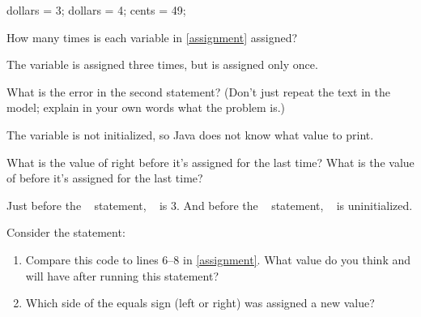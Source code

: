 \vspace{1em}
\hfill
\begin{minipage}[t]{0.5\textwidth}

\vspace{-1em}
\begin{javalst}
dollars = 3;
dollars = 4;
cents = 49;
\end{javalst}

\end{minipage}
\hfill
\begin{minipage}[t]{0.4\textwidth}

\par\vspace{1em}

\end{minipage}
\vspace{1ex}




\Q How many times is each variable in \ref{assignment} assigned?

\begin{answer}
The variable  is assigned three times, but  is assigned only once.
\end{answer}


\Q What is the error in the second  statement? (Don't just repeat the text in the model; explain in your own words what the problem is.)

\begin{answer}
The variable  is not initialized, so Java does not know what value to print.
\end{answer}


\Q What is the value of  right before it's assigned for the last time?
What is the value of  before it's assigned for the last time?

\begin{answer}
Just before the ~ statement, ~ is 3.
And before the ~ statement, ~ is uninitialized.
\end{answer}




\Q Consider the statement: ~

\begin{enumerate}

\item Compare this code to lines 6--8 in \ref{assignment}.
What value do you think  and  will have after running this statement?


\item Which side of the equals sign (left or right) was assigned a new value?


\end{enumerate}


